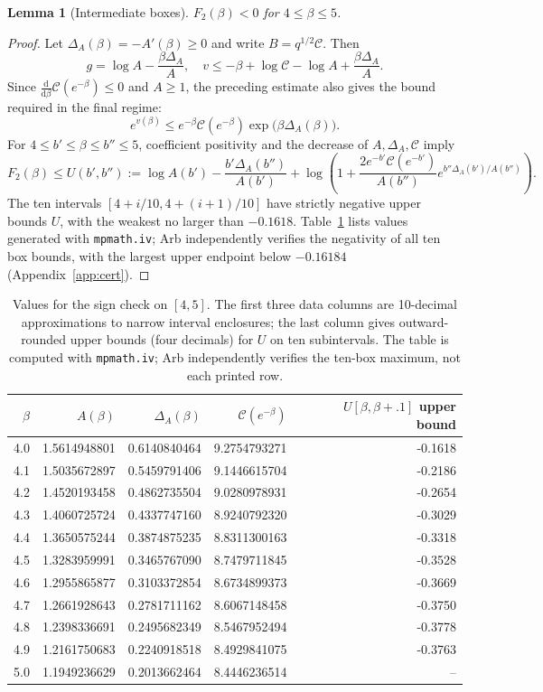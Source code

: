 \documentclass[10pt,a4paper]{article}
\numberwithin{equation}{section}
\newtheorem{lemma}[theorem]{Lemma}\newtheorem{proposition}[theorem]{Proposition}
\theoremstyle{remark}\newtheorem{remark}[theorem]{Remark}\newtheorem{question}[theorem]{Question}
\newcommand{\dd}{\mathrm d}
\begin{document}
\begin{lemma}[Intermediate boxes]\label{lem:middle}
$F_2(\beta)<0$ for $4\le\beta\le5$.
\end{lemma}
\begin{proof}Let $\Delta_A(\beta)=-A'(\beta)\ge0$ and write $B=q^{1/2}\mathcal C$. Then
\[
g=\log A-\frac{\beta\Delta_A}{A},\quad
v\le-\beta+\log\mathcal C-\log A+\frac{\beta\Delta_A}{A}.
\]
Since $\frac{\dd}{\dd\beta}\mathcal C(e^{-\beta})\le0$ and $A\ge1$, the preceding estimate also gives the bound required in the final regime:
\begin{equation}\label{eq:exp-v-bound}
e^{v(\beta)}\le e^{-\beta}\mathcal C(e^{-\beta})\exp\bigl(\beta\Delta_A(\beta)\bigr).
\end{equation}
For $4\le b'\le\beta\le b''\le5$, coefficient positivity and the decrease of $A,\Delta_A,\mathcal C$ imply
\begin{equation}\label{eq:box}
F_2(\beta)\le U(b',b''):=\log A(b')-\frac{b'\Delta_A(b'')}{A(b')}
+\log\left(1+\frac{2e^{-b'}\mathcal C(e^{-b'})}{A(b'')}e^{b''\Delta_A(b')/A(b'')}\right).
\end{equation}
The ten intervals $[4+i/10,4+(i+1)/10]$ have strictly negative upper bounds $U$, with the weakest no larger than $-0.1618$. Table~\ref{tab:intervals} lists values generated with \texttt{mpmath.iv}; Arb independently verifies the negativity of all ten box bounds, with the largest upper endpoint below $-0.16184$ (Appendix~\ref{app:cert}).\end{proof}
\begin{table}[htbp]\centering\small
\begin{tabular}{rrrrr}\toprule
$\beta$&$A(\beta)$&$\Delta_A(\beta)$&$\mathcal C(e^{-\beta})$&$U[\beta,\beta+.1]$ upper bound\\\midrule
4.0&1.5614948801&0.6140840464&9.2754793271&-0.1618\\
4.1&1.5035672897&0.5459791406&9.1446615704&-0.2186\\
4.2&1.4520193458&0.4862735504&9.0280978931&-0.2654\\
4.3&1.4060725724&0.4337747160&8.9240792320&-0.3029\\
4.4&1.3650575244&0.3874875235&8.8311300163&-0.3318\\
4.5&1.3283959991&0.3465767090&8.7479711845&-0.3528\\
4.6&1.2955865877&0.3103372854&8.6734899373&-0.3669\\
4.7&1.2661928643&0.2781711162&8.6067148458&-0.3750\\
4.8&1.2398336691&0.2495682349&8.5467952494&-0.3778\\
4.9&1.2161750683&0.2240918518&8.4929841075&-0.3763\\
5.0&1.1949236629&0.2013662464&8.4446236514&--\\
\bottomrule
\end{tabular}
\caption{Values for the sign check on $[4,5]$. The first three data columns are 10-decimal approximations to narrow interval enclosures; the last column gives outward-rounded upper bounds (four decimals) for $U$ on ten subintervals. The table is computed with \texttt{mpmath.iv}; Arb independently verifies the ten-box maximum, not each printed row.}\label{tab:intervals}
\end{table}
\end{document}
